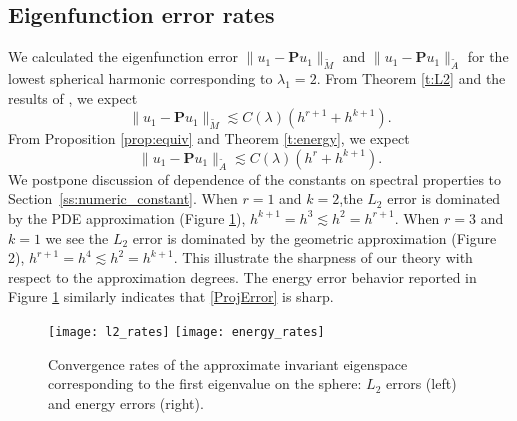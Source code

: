 \documentclass{siamart0516}
\newcommand{\bP}{\ensuremath{\boldsymbol P}}
\numberwithin{equation}{section}
\numberwithin{theorem}{section}
\numberwithin{figure}{section}
\begin{document}
\subsection{Eigenfunction error rates}
We calculated the eigenfunction error $\|u_1-\bP u_1\|_{\tilde{M}}$ and $\|u_1-\bP u_1\|_{\tilde{A}}$ for the lowest spherical harmonic corresponding to $\lambda_1=2$. From Theorem \ref{t:L2} and the results of \cite{D09}, we expect 
\begin{equation}
\|u_1-\bP u_1\|_{\tilde{M}}\lesssim C(\lambda)(h^{r+1}+h^{k+1}).
\end{equation}
From Proposition \ref{prop:equiv} and Theorem \ref{t:energy}, we expect 
\begin{equation}
\|u_1-\bP u_1\|_{\tilde{A}}\lesssim C(\lambda)(h^{r} + h^{k+1}).
\label{ProjError}
\end{equation}
We postpone discussion of dependence of the constants on spectral properties to Section~\ref{ss:numeric_constant}. When $r=1$ and $k=2$,the $L_2$ error is dominated by the PDE approximation (Figure \ref{fig2}), $h^{k+1} = h^3 \lesssim h^2=h^{r+1}$. When $r=3$ and $k=1$ we see the $L_2$ error is dominated by the geometric approximation (Figure 2), $h^{r+1} =h^4 \lesssim h^2 =h^{k+1}$. This illustrate the sharpness of our theory with respect to the approximation degrees. The energy error behavior reported in Figure \ref{fig2} similarly indicates that \eqref{ProjError} is sharp.  

\setlength{\unitlength}{.75cm}
\begin{figure}[h]
\centering
\texttt{[image: l2\_rates]}
\texttt{[image: energy\_rates]}
\caption{Convergence rates of the approximate invariant eigenspace corresponding to the first eigenvalue on the sphere:  $L_2$ errors (left) and energy errors (right).}
\label{fig2}
\end{figure}
\end{document}

